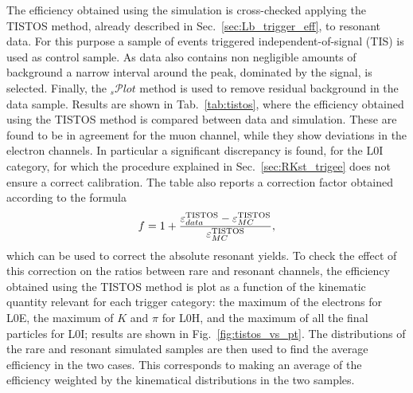 The efficiency obtained using the simulation is cross-checked applying the TISTOS method, 
already described in Sec.~\ref{sec:Lb_trigger_eff}, to resonant data.
%
%
For this purpose a sample of events triggered independent-of-signal (TIS) is used as control sample.
As data also contains non negligible amounts of background 
a narrow interval around the peak, dominated by the signal, is selected.
Finally, the $_{s}\mathcal{P}lot$ method is used to remove residual background in the data sample. 
Results are shown in Tab.~\ref{tab:tistos}, where the
efficiency obtained using the TISTOS method is compared between data and simulation.
These are found to be in agreement for the muon channel,
while they show deviations in the electron channels. In particular a significant discrepancy is found,
for the L0I category, for which the procedure explained in Sec.~\ref{sec:RKst_trigee} does not ensure
a correct calibration. The table also reports a correction factor
obtained according to the formula
\begin{equation}
f = 1 + \frac{\varepsilon_{data}^{\rm TISTOS} - \varepsilon_{MC}^{\rm  TISTOS}}{\varepsilon_{MC}^{\rm  TISTOS}},
\end{equation}
which can be used to correct the absolute resonant yields.
%
To check the effect of this correction on the ratios between rare and resonant channels,
the efficiency obtained using the TISTOS method is plot as a function of the kinematic
quantity relevant for each trigger category:
the maximum \pt of the electrons for L0E, the maximum \pt of $K$ and $\pi$ for L0H,
and the maximum \pt of all the final particles for L0I; results are shown in Fig.~\ref{fig:tistos_vs_pt}.
The \pt distributions of the rare and resonant simulated samples are then used to find
the average efficiency in the two cases. This corresponds to making an average of the efficiency
weighted by the kinematical distributions in the two samples. 
